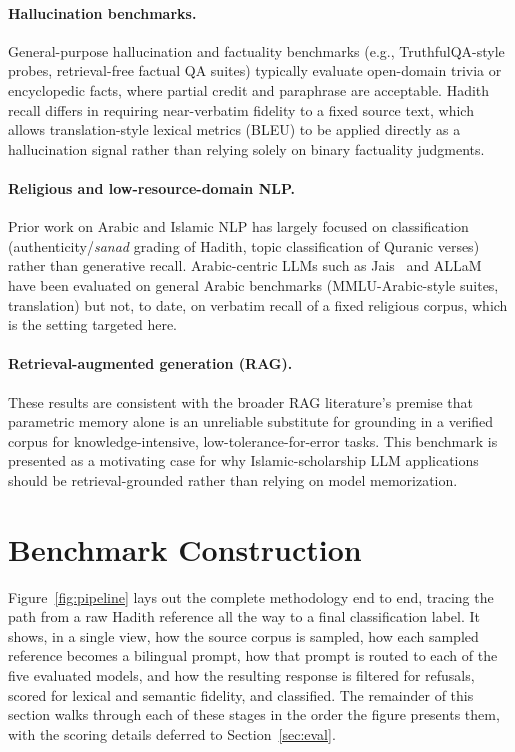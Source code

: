\documentclass{article}
\begin{document}
\paragraph{Hallucination benchmarks.}
General-purpose hallucination and factuality benchmarks (e.g., TruthfulQA-style
probes, retrieval-free factual QA suites) typically evaluate open-domain trivia
or encyclopedic facts, where partial credit and paraphrase are acceptable.
Hadith recall differs in requiring near-verbatim fidelity to a fixed source
text, which allows translation-style lexical metrics (BLEU) to be applied
directly as a hallucination signal rather than relying solely on binary
factuality judgments.

\paragraph{Religious and low-resource-domain NLP.}
Prior work on Arabic and Islamic NLP has largely focused on classification
(authenticity/\emph{sanad} grading of Hadith, topic classification of Quranic
verses) rather than generative recall. Arabic-centric LLMs such as
Jais~\cite{jais} and ALLaM~\cite{allam} have been evaluated on general Arabic
benchmarks (MMLU-Arabic-style suites, translation) but not, to date, on
verbatim recall of a fixed religious corpus, which is the setting targeted
here.

\paragraph{Retrieval-augmented generation (RAG).}
These results are consistent with the broader RAG literature's premise that
parametric memory alone is an unreliable substitute for grounding in a verified
corpus for knowledge-intensive, low-tolerance-for-error tasks. This benchmark
is presented as a motivating case for why Islamic-scholarship LLM applications
should be retrieval-grounded rather than relying on model memorization.

\section{Benchmark Construction}
\label{sec:benchmark}

Figure~\ref{fig:pipeline} lays out the complete methodology end to end,
tracing the path from a raw Hadith reference all the way to a final
classification label. It shows, in a single view, how the source corpus is
sampled, how each sampled reference becomes a bilingual prompt, how that
prompt is routed to each of the five evaluated models, and how the
resulting response is filtered for refusals, scored for lexical and
semantic fidelity, and classified. The remainder of this section walks
through each of these stages in the order the figure presents them, with
the scoring details deferred to Section~\ref{sec:eval}.
\end{document}
